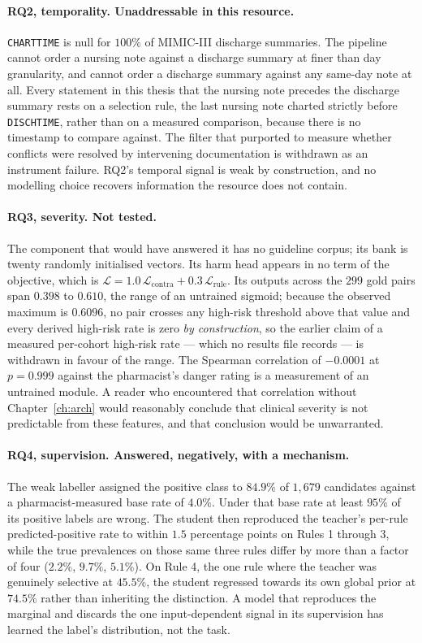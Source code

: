 \paragraph{RQ2, temporality. Unaddressable in this resource.}
\texttt{CHARTTIME} is null for $100\%$ of MIMIC-III discharge summaries. The
pipeline cannot order a nursing note against a discharge summary at finer than
day granularity, and cannot order a discharge summary against any same-day note
at all. Every statement in this thesis that the nursing note precedes the
discharge summary rests on a selection rule, the last nursing note charted
strictly before \texttt{DISCHTIME}, rather than on a measured comparison, because
there is no timestamp to compare against. The filter that purported to measure
whether conflicts were resolved by intervening documentation is withdrawn as an
instrument failure. RQ2's temporal signal is weak by construction, and no
modelling choice recovers information the resource does not contain.

\paragraph{RQ3, severity. Not tested.} The component that would have answered it
has no guideline corpus; its bank is twenty randomly initialised vectors. Its
harm head appears in no term of the objective, which is
$\mathcal{L} = 1.0\,\mathcal{L}_{\text{contra}} +
0.3\,\mathcal{L}_{\text{rule}}$. Its outputs across the $299$ gold pairs span
$0.398$ to $0.610$, the range of an untrained sigmoid; because the observed
maximum is $0.6096$, no pair crosses any high-risk threshold above that value and
every derived high-risk rate is zero \emph{by construction}, so the earlier claim
of a measured per-cohort high-risk rate --- which no results file records --- is
withdrawn in favour of the range. The Spearman correlation of $-0.0001$ at
$p = 0.999$ against the pharmacist's danger rating is a measurement of an
untrained module. A reader who encountered that correlation without
Chapter~\ref{ch:arch} would reasonably conclude that clinical severity is not
predictable from these features, and that conclusion would be unwarranted.

\paragraph{RQ4, supervision. Answered, negatively, with a mechanism.} The weak
labeller assigned the positive class to $84.9\%$ of $1{,}679$ candidates against
a pharmacist-measured base rate of $4.0\%$. Under that base rate at least $95\%$
of its positive labels are wrong. The student then reproduced the teacher's
per-rule predicted-positive rate to within $1.5$ percentage points on Rules 1
through 3, while the true prevalences on those same three rules differ by more
than a factor of four ($2.2\%$, $9.7\%$, $5.1\%$). On Rule 4, the one rule where
the teacher was genuinely selective at $45.5\%$, the student regressed towards
its own global prior at $74.5\%$ rather than inheriting the distinction. A model
that reproduces the marginal and discards the one input-dependent signal in its
supervision has learned the label's distribution, not the task.

